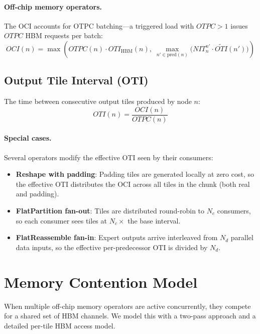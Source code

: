 \documentclass[10pt]{article}
\begin{document}
\paragraph{Off-chip memory operators.} The OCI accounts for OTPC batching---a triggered load with $\mathit{OTPC} > 1$ issues $\mathit{OTPC}$ HBM requests per batch:
\begin{equation}
    \mathit{OCI}(n) = \max\!\left(\mathit{OTPC}(n) \cdot \mathit{OTI}_{\text{HBM}}(n),\; \max_{n' \in \text{pred}(n)} \bigl(\mathit{NIT}^{n'}_n \cdot \widetilde{\mathit{OTI}}(n')\bigr)\right)
\end{equation}

\subsection{Output Tile Interval (OTI)}

The time between consecutive output tiles produced by node $n$:
\begin{equation}
    \mathit{OTI}(n) = \frac{\mathit{OCI}(n)}{\mathit{OTPC}(n)}
\end{equation}

\paragraph{Special cases.} Several operators modify the effective OTI seen by their consumers:
\begin{itemize}[nosep]
    \item \textbf{Reshape with padding}: Padding tiles are generated locally at zero cost, so the effective OTI distributes the OCI across all tiles in the chunk (both real and padding).
    \item \textbf{FlatPartition fan-out}: Tiles are distributed round-robin to $N_c$ consumers, so each consumer sees tiles at $N_c \times$ the base interval.
    \item \textbf{FlatReassemble fan-in}: Expert outputs arrive interleaved from $N_d$ parallel data inputs, so the effective per-predecessor OTI is divided by $N_d$.
\end{itemize}

\section{Memory Contention Model}
\label{sec:contention}

When multiple off-chip memory operators are active concurrently, they compete for a shared set of HBM channels. We model this with a two-pass approach and a detailed per-tile HBM access model.
\end{document}
